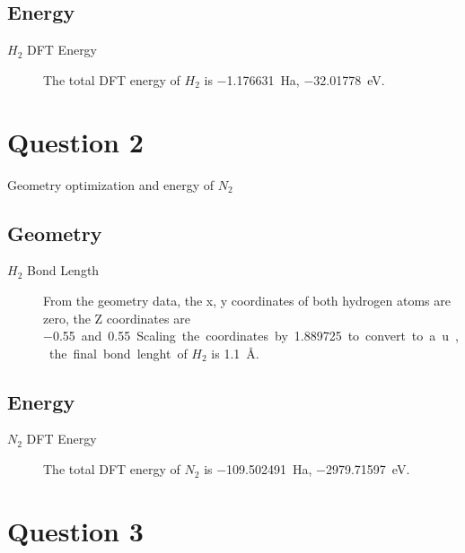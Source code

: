 \documentclass{article}
\begin{document}
\subsection{Energy}
\begin{description}
\item[$H_{2}$ DFT Energy]
The total DFT energy of $H_{2}$ is \SI{-1.176631}{Ha}, \SI{-32.01778}{\eV}. 
\end{description}

 

\section{Question 2 }

Geometry optimization and energy of $N_{2}$

\subsection{Geometry}
\begin{description}
\item[$H_{2}$ Bond Length]
From the geometry data, the x, y coordinates of both hydrogen atoms are zero, the Z coordinates are \SI{-0.55} and \SI{0.55}. Scaling the coordinates by \SI{1.889725} to convert to a.u., the final bond lenght of $H_{2}$ is \SI{1.1}{\angstrom}. 
\end{description} 

\subsection{Energy}
\begin{description}
\item[$N_{2}$ DFT Energy]
The total DFT energy of $N_{2}$ is \SI{-109.502491}{Ha}, \SI{-2979.71597}{\eV}. 
\end{description}


\section{Question 3}
\end{document}
